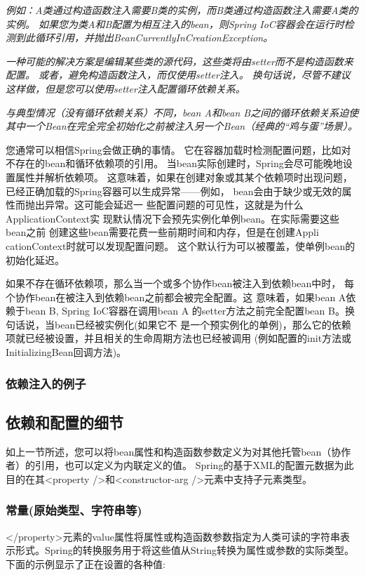 \textit{例如：A类通过构造函数注入需要B类的实例，而B类通过构造函数注入需要A类的实例。 如果您为类A和B配置为相互注入的bean，则Spring IoC容器会在运行时检测到此循环引用，并抛出BeanCurrentlyInCreationException。}

\textit{一种可能的解决方案是编辑某些类的源代码，这些类将由setter而不是构造函数来配置。 或者，避免构造函数注入，而仅使用setter注入。 换句话说，尽管不建议这样做，但是您可以使用setter注入配置循环依赖关系。}

\textit{与典型情况（没有循环依赖关系）不同，bean A和bean B之间的循环依赖关系迫使其中一个Bean在完全完全初始化之前被注入另一个Bean（经典的“鸡与蛋”场景）。}

您通常可以相信Spring会做正确的事情。
它在容器加载时检测配置问题，比如对不存在的bean和循环依赖项的引用。
当bean实际创建时，Spring会尽可能晚地设置属性并解析依赖项。
这意味着，如果在创建对象或其某个依赖项时出现问题，已经正确加载的Spring容器可以生成异常——例如，
bean会由于缺少或无效的属性而抛出异常。这可能会延迟一
些配置问题的可见性，这就是为什么ApplicationContext实
现默认情况下会预先实例化单例bean。在实际需要这些bean之前
创建这些bean需要花费一些前期时间和内存，但是在创建Appli
cationContext时就可以发现配置问题。
这个默认行为可以被覆盖，使单例bean的初始化延迟。

如果不存在循环依赖项，那么当一个或多个协作bean被注入到依赖bean中时，
每个协作bean在被注入到依赖bean之前都会被完全配置。这
意味着，如果bean A依赖于bean B, Spring IoC容器在调用bean A
的setter方法之前完全配置bean B。换句话说，当bean已经被实例化(如果它不
是一个预实例化的单例)，那么它的依赖项就已经被设置，并且相关的生命周期方法也已经被调用
(例如配置的init方法或InitializingBean回调方法)。

\subsubsection{依赖注入的例子}
\newpage
\subsection{依赖和配置的细节}
如上一节所述，您可以将bean属性和构造函数参数定义为对其他托管bean（协作者）的引用，也可以定义为内联定义的值。 Spring的基于XML的配置元数据为此目的在其<property />和<constructor-arg />元素中支持子元素类型。

\subsubsection{常量(原始类型、字符串等)}

</property>元素的value属性将属性或构造函数参数指定为人类可读的字符串表示形式。Spring的转换服务用于将这些值从String转换为属性或参数的实际类型。下面的示例显示了正在设置的各种值:

